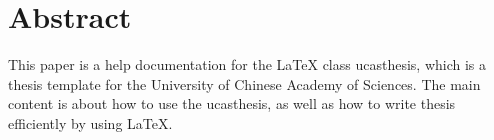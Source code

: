 \chapter*{Abstract}%

This paper is a help documentation for the \LaTeX{} class ucasthesis, which is  a thesis template for the University of Chinese Academy of Sciences. The main content is about how to use the ucasthesis, as well as how to write thesis efficiently by using \LaTeX{}.

